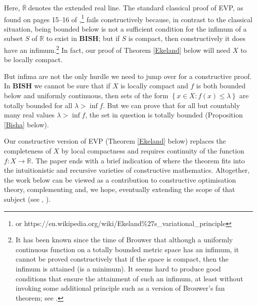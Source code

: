 \documentclass[11pt]{article}%
\begin{document}
%

\noindent
Here, $\overline{\mathbb{R}}\mathbb{\ }$denotes the extended real line. The
standard classical proof of EVP, as found on pages 15--16 of \cite{Aubin}%
,\footnote{%
\normalfont\sf
or https://en.wikipedia.org/wiki/Ekeland\%27s\_variational\_principle} fails
constructively because, in contrast to the classical situation, being bounded
below is not a sufficient condition for the infimum of a subset $S$ of
$\mathbb{R}$ to exist in \textbf{BISH}; but if $S$ is compact, then
constructively it does have an infimum.\footnote{%
\normalfont\sf
It has been known since the time of Brouwer that although a uniformly
continuous function on a totally bounded metric space has an infimum, it
cannot be proved constructively that if the space is compact, then the infimum
is attained (is a minimum). It seems hard to produce good conditions that
ensure the attainment of such an infimum, at least without invoking some
additional principle such as a version of Brouwer's fan theorem; see
\cite{bbs,dsbopt,Schuster}.} In fact, our proof of Theorem \ref{Ekeland} below
will need $X$ to be locally compact.

But infima are not the only hurdle we need to jump over for a constructive
proof. In \textbf{BISH} we cannot be sure that if $X$ is locally compact and
$f$ is both bounded below and uniformly continuous, then sets of the form
$\left\{  x\in X:f(x)\leqslant\lambda\right\}  $ are totally bounded for all
$\lambda>\inf f$. But we can prove that for all but countably many real values
$\lambda>\inf f$, the set in question is totally bounded (Proposition
\ref{Bisha} below).

Our constructive version of EVP (Theorem \ref{Ekeland} below) replaces the
completeness of $X$ by local compactness and requires continuity of the
function $f:X\rightarrow\mathbb{R}$. The paper ends with a brief indication of
where the theorem fits into the intuitionistic and recursive varieties of
constructive mathematics. Altogether, the work below can be viewed as a
contribution to constructive optimisation theory, complementing and, we hope,
eventually extending the scope of that subject (see \cite[Chs. 11 and
12]{Handbook}, \cite{dsbopt,Schuster}).
\end{document}
